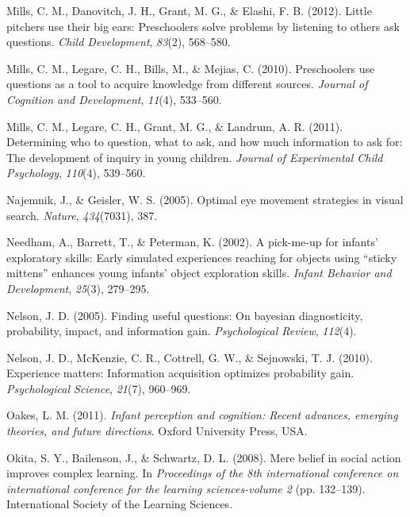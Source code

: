 \documentclass[oneside]{report}
\begin{document}
\leavevmode\hypertarget{ref-mills2012little}{}%
Mills, C. M., Danovitch, J. H., Grant, M. G., \& Elashi, F. B. (2012).
Little pitchers use their big ears: Preschoolers solve problems by
listening to others ask questions. \emph{Child Development},
\emph{83}(2), 568--580.

\leavevmode\hypertarget{ref-mills2010preschoolers}{}%
Mills, C. M., Legare, C. H., Bills, M., \& Mejias, C. (2010).
Preschoolers use questions as a tool to acquire knowledge from different
sources. \emph{Journal of Cognition and Development}, \emph{11}(4),
533--560.

\leavevmode\hypertarget{ref-mills2011determining}{}%
Mills, C. M., Legare, C. H., Grant, M. G., \& Landrum, A. R. (2011).
Determining who to question, what to ask, and how much information to
ask for: The development of inquiry in young children. \emph{Journal of
Experimental Child Psychology}, \emph{110}(4), 539--560.

\leavevmode\hypertarget{ref-najemnik2005optimal}{}%
Najemnik, J., \& Geisler, W. S. (2005). Optimal eye movement strategies
in visual search. \emph{Nature}, \emph{434}(7031), 387.

\leavevmode\hypertarget{ref-needham2002pick}{}%
Needham, A., Barrett, T., \& Peterman, K. (2002). A pick-me-up for
infants' exploratory skills: Early simulated experiences reaching for
objects using ``sticky mittens'' enhances young infants' object
exploration skills. \emph{Infant Behavior and Development},
\emph{25}(3), 279--295.

\leavevmode\hypertarget{ref-nelson2005finding}{}%
Nelson, J. D. (2005). Finding useful questions: On bayesian
diagnosticity, probability, impact, and information gain.
\emph{Psychological Review}, \emph{112}(4).

\leavevmode\hypertarget{ref-nelson2010experience}{}%
Nelson, J. D., McKenzie, C. R., Cottrell, G. W., \& Sejnowski, T. J.
(2010). Experience matters: Information acquisition optimizes
probability gain. \emph{Psychological Science}, \emph{21}(7), 960--969.

\leavevmode\hypertarget{ref-oakes2011infant}{}%
Oakes, L. M. (2011). \emph{Infant perception and cognition: Recent
advances, emerging theories, and future directions}. Oxford University
Press, USA.

\leavevmode\hypertarget{ref-okita2008mere}{}%
Okita, S. Y., Bailenson, J., \& Schwartz, D. L. (2008). Mere belief in
social action improves complex learning. In \emph{Proceedings of the 8th
international conference on international conference for the learning
sciences-volume 2} (pp. 132--139). International Society of the Learning
Sciences.
\end{document}
